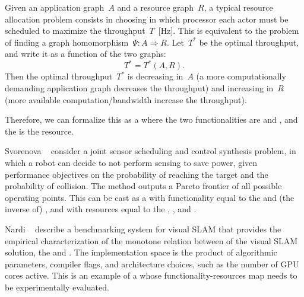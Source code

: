 Given an application graph~$A$ and a resource graph~$R$, a typical resource allocation problem consists in choosing in which processor each actor must be scheduled to maximize the throughput~$T$~[Hz].
This is equivalent to the problem of finding a graph homomorphism~$\Psi \colon A \Rightarrow R$.
Let~$T^{\ast}$ be the optimal throughput, and write it as a function of the two graphs:
\begin{equation}
    T^{\ast}=T^{\ast}(A,R).
\end{equation}
Then the optimal throughput~$T^{\ast}$ is decreasing in~$A$ (a more computationally demanding application graph decreases the throughput) and increasing in~$R$ (more available computation/bandwidth increase the throughput).

Therefore, we can formalize this as a  where the two functionalities are  and , and the  is the resource.

\begin{figure*}[h!]
    \centering
    \caption{}
\end{figure*}

\begin{example}
    Svorenova\,\,\etal~\cite{svorenova16resource} consider a joint sensor scheduling and control synthesis problem, in which a robot can decide to not perform sensing to save power, given performance objectives on the probability of reaching the target and the probability of collision.
    The method outputs a Pareto frontier of all possible operating points.
    This can be cast as a  with functionality equal to the  and (the inverse of) , and with resources equal to the
    , , and .
\end{example}

\begin{figure}[h]
    \centering
    \caption{}
    \label{fig:progressive-1-1}
\end{figure}

\begin{example}
    Nardi\,\,\etal~\cite{zia16comparative} describe a benchmarking system for visual SLAM that provides the empirical characterization of the monotone relation between  of the visual SLAM solution, the  and .
    The implementation space is the product of algorithmic parameters, compiler flags, and architecture choices, such as the number of GPU cores active.
    This is an example of a  whose functionality-resources map needs to be experimentally evaluated.
\end{example}

